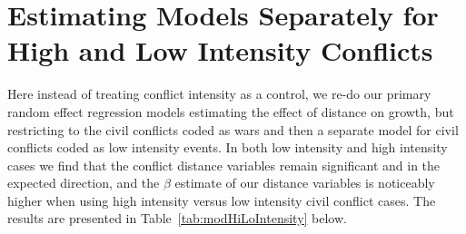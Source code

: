 \documentclass[12pt,onesided]{amsart}
\begin{document}

\FloatBarrier

\clearpage
\section{Estimating Models Separately for High and Low Intensity Conflicts}

Here instead of treating conflict intensity as a control, we re-do our primary random effect regression models estimating the effect of distance on growth, but restricting to the civil conflicts coded as wars and then a separate model for civil conflicts coded as low intensity events. In both low intensity and high intensity cases we find that the conflict distance variables remain significant and in the expected direction, and the $\beta$ estimate of our distance variables is noticeably higher when using high intensity versus low intensity civil conflict cases. The results are presented in Table~\ref{tab:modHiLoIntensity} below.


\FloatBarrier
\newpage

\newpage

%  


\end{document}
